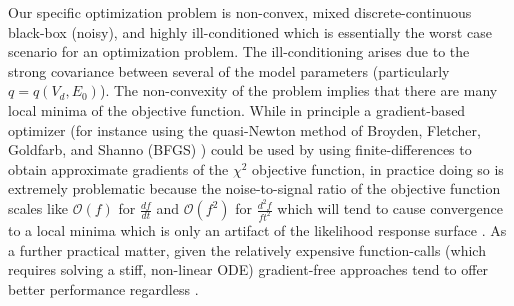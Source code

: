 \documentclass[12pt,a4paper,oneside]{book}
\begin{document}
Our specific optimization problem is non-convex, mixed discrete-continuous black-box (noisy), and highly ill-conditioned which is essentially the worst case scenario for an optimization problem. The ill-conditioning arises due to the strong covariance between several of the model parameters (particularly $q=q(V_d, E_0)$). The non-convexity of the problem implies that there are many local minima of the objective function. While in principle a gradient-based optimizer (for instance using the quasi-Newton method of Broyden, Fletcher, Goldfarb, and Shanno (BFGS) \cite{_numerical_????}) could be used by using finite-differences to obtain approximate gradients of the $\chi^2$ objective function, in practice doing so is extremely problematic because the noise-to-signal ratio of the objective function scales like $\mathcal{O}(f)$ for $\frac{df}{dt}$ and $\mathcal{O}(f^2)$ for $\frac{d^2f}{ft^2}$ which will tend to cause convergence to a local minima which is only an artifact of the likelihood response surface \cite{wood_data_1982}. As a further practical matter, given the relatively expensive function-calls (which requires solving a stiff, non-linear ODE) gradient-free approaches tend to offer better performance regardless \cite{kolda_optimization_2003}.  
\end{document}
